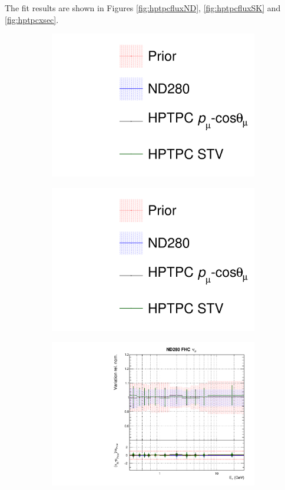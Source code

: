 The fit results are shown in Figures \ref{fig:hptpcfluxND}, \ref{fig:hptpcfluxSK} and \ref{fig:hptpcxsec}.

\begin{figure}
\centering
\begin{subfigure}{0.3\textwidth}
  \centering
  \includegraphics[width=1.0\linewidth, trim={5mm  90mm 0mm 0mm}, clip]{figs/hptpcfits_leg}	
\end{subfigure}
\begin{subfigure}{0.3\textwidth}
  \centering
  \includegraphics[width=1.0\linewidth, trim={5mm  0mm 0mm 95mm}, clip]{figs/hptpcfits_leg}	
\end{subfigure}
\begin{subfigure}{0.45\textwidth}
  \centering
  \includegraphics[width=0.75\linewidth]{figs/hptpcfitsflux_0}

\end{subfigure}
\end{figure}
